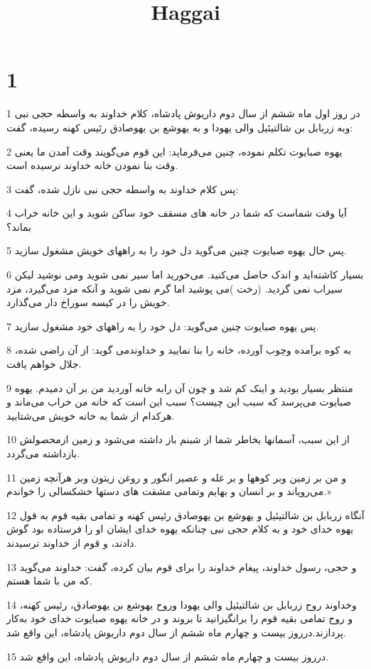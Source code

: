 

\title{Haggai}


\chapter{1}

\par 1 در روز اول ماه ششم از سال دوم داریوش پادشاه، کلام خداوند به واسطه حجی نبی وبه زربابل بن شالتیئیل والی یهودا و به یهوشع بن یهوصادق رئیس کهنه رسیده، گفت:
\par 2 یهوه صبایوت تکلم نموده، چنین می‌فرماید: این قوم می‌گویند وقت آمدن ما یعنی وقت بنا نمودن خانه خداوند نرسیده است.
\par 3 پس کلام خداوند به واسطه حجی نبی نازل شده، گفت:
\par 4 آیا وقت شماست که شما در خانه های مسقف خود ساکن شوید و این خانه خراب بماند؟
\par 5 پس حال یهوه صبایوت چنین می‌گوید دل خود را به راههای خویش مشغول سازید.
\par 6 بسیار کاشته‌اید و اندک حاصل می‌کنید. می‌خورید اما سیر نمی شوید ومی نوشید لیکن سیراب نمی گردید. (رخت )می پوشید اما گرم نمی شوید و آنکه مزد می‌گیرد، مزد خویش را در کیسه سوراخ دار می‌گذارد.
\par 7 پس یهوه صبایوت چنین می‌گوید: دل خود را به راههای خود مشغول سازید.
\par 8 به کوه برآمده وچوب آورده، خانه را بنا نمایید و خداوندمی گوید: از آن راضی شده، جلال خواهم یافت.
\par 9 منتظر بسیار بودید و اینک کم شد و چون آن رابه خانه آوردید من بر آن دمیدم. یهوه صبایوت می‌پرسد که سبب این چیست؟ سبب این است که خانه من خراب می‌ماند و هرکدام از شما به خانه خویش می‌شتابید.
\par 10 از این سبب، آسمانها بخاطر شما از شبنم باز داشته می‌شود و زمین ازمحصولش بازداشته می‌گردد.
\par 11 و من بر زمین وبر کوهها و بر غله و عصیر انگور و روغن زیتون وبر هر‌آنچه زمین می‌رویاند و بر انسان و بهایم وتمامی مشقت های دستها خشکسالی را خواندم.»
\par 12 آنگاه زربابل بن شالتیئیل و یهوشع بن یهوصادق رئیس کهنه و تمامی بقیه قوم به قول یهوه خدای خود و به کلام حجی نبی چنانکه یهوه خدای ایشان او را فرستاده بود گوش دادند، و قوم از خداوند ترسیدند.
\par 13 و حجی، رسول خداوند، پیغام خداوند را برای قوم بیان کرده، گفت: خداوند می‌گوید که من با شما هستم.
\par 14 وخداوند روح زربابل بن شالتیئیل والی یهودا وروح یهوشع بن یهوصادق، رئیس کهنه، و روح تمامی بقیه قوم را برانگیزانید تا بروند و در خانه یهوه صبایوت خدای خود به‌کار پردازند.درروز بیست و چهارم ماه ششم از سال دوم داریوش پادشاه، این واقع شد.
\par 15 درروز بیست و چهارم ماه ششم از سال دوم داریوش پادشاه، این واقع شد.

